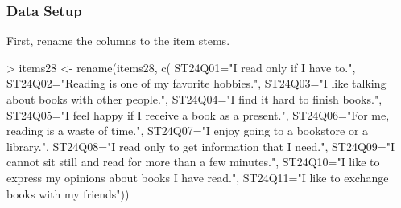 \documentclass[10pt,slidestop,mathserif,c]{beamer}
\begin{document}
\begin{frame}
	\frametitle{Data Setup}
    First, rename the columns to the item stems.
    
\begin{Schunk}
\begin{Sinput}
> items28 <- rename(items28, c(
   			ST24Q01="I read only if I have to.",
   			ST24Q02="Reading is one of my favorite hobbies.",
   			ST24Q03="I like talking about books with other people.",
   			ST24Q04="I find it hard to finish books.",
   			ST24Q05="I feel happy if I receive a book as a present.",
   			ST24Q06="For me, reading is a waste of time.",
   			ST24Q07="I enjoy going to a bookstore or a library.",
   			ST24Q08="I read only to get information that I need.",
   			ST24Q09="I cannot sit still and read for more than a few minutes.",
   			ST24Q10="I like to express my opinions about books I have read.",
   			ST24Q11="I like to exchange books with my friends"))
\end{Sinput}
\end{Schunk}
\end{frame}
\end{document}
